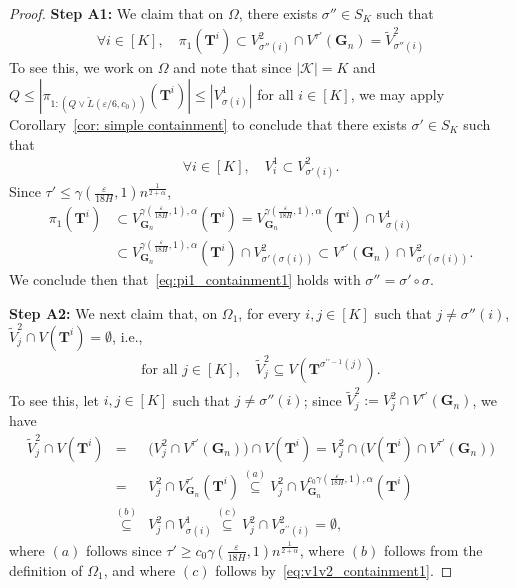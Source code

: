 \documentclass[twoside,11pt]{article}
\theoremstyle{remark}
\begin{document}
\begin{proof}
\textbf{Step A1:} We claim that on $\Omega$, there exists $\sigma'' \in S_K$ such that
\begin{align}
\forall i \in [K], \quad \pi_1(\bm{T}^{i}) \subset V_{\sigma''(i)}^2 \cap V^{\tau'}(\bm{G}_n) = \tilde{V}_{\sigma''(i)}^2\label{eq:pi1_containment1}
\end{align}
To see this, we work on $\Omega$ and note that since $|\mathcal{K}| = K$ and $Q \leq |\pi_{1:(Q \vee {\tilde{L}(\varepsilon/6, c_0)})}(\bm{T}^{i}) | \leq |V_{\sigma(i)}^1|$ for all $i \in [K]$, we may apply Corollary~\ref{cor: simple containment} to conclude that there exists $\sigma' \in S_K$ such that 
\begin{align}
\forall i \in [K], \quad V_i^1 \subset V_{\sigma'(i)}^2. \label{eq:v1v2_containment1}
\end{align}
Since $\tau' \leq \gamma(\frac{\varepsilon}{18H}, 1) n^{\frac{1}{2+\alpha}}$, 
\begin{align*}
\pi_1(\bm{T}^i) &\subset V_{\bm{G}_n}^{\gamma(\frac{\varepsilon}{18H}, 1), \alpha}(\bm{T}^i) = V_{\bm{G}_n}^{\gamma(\frac{\varepsilon}{18H}, 1), \alpha}(\bm{T}^i) \cap V_{\sigma(i)}^1 \\
%
&\subset V_{\bm{G}_n}^{\gamma(\frac{\varepsilon}{18H}, 1), \alpha}(\bm{T}^i) \cap V_{\sigma'(\sigma(i))}^2 \subset V^{\tau'}(\bm{G}_n) \cap V_{\sigma'(\sigma(i))}^2. 
\end{align*}
We conclude then that~\eqref{eq:pi1_containment1} holds with $\sigma'' = \sigma' \circ \sigma$.


\textbf{Step A2:} We next claim that, on $\Omega_1$, for every $i,j \in [K]$ such that $j \neq \sigma''(i)$, $\tilde{V}^2_{j} \cap V(\bm{T}^i) =\emptyset$, i.e., 
\begin{align}
\text{for all $j \in [K]$},\quad \tilde{V}^2_{j}\subseteq V(\bm{T}^{\sigma^{\prime\prime -1}(j)}). 
\label{eq: tilde vj2 well classified 2}
\end{align}
To see this, let $i, j \in [K]$ such that $j \neq \sigma''(i)$; since $\tilde{V}_{j}^2:=V_{j}^2 \cap V^{\tau'}(\bm{G}_n)$, we have 
%
\begin{eqnarray}
\label{eq: tilde vj2 well classified}
\nonumber
\tilde{V}_{j}^2 \cap V(\bm{T}^i)&=& \bigr({V}_{j}^2 \cap V^{\tau'}(\bm{G}_n)\bigr) \cap V(\bm{T}^i)={V}_{j}^2  \cap \bigr( V(\bm{T}^i)\cap V^{\tau'}(\bm{G}_n)\bigr)\\
\nonumber
&=& {V}_{j}^2 \cap V_{\bm G_n}^{\tau'}(\bm{T}^i) \stackrel{(a)}{\subseteq} {V}_{j}^2 \cap V_{\bm{G}_n}^{c_0 \gamma(\frac{\varepsilon}{18H},1),\alpha}(\bm{T}^i)\\
&\stackrel{(b)}{\subseteq} &{V}_{j}^2 \cap V^1_{\sigma(i)} \stackrel{(c)}{\subseteq} {V}_{j}^2 \cap V^2_{\sigma^{\prime\prime}(i)}=\emptyset,
\end{eqnarray}
where $(a)$ follows since $\tau' \geq c_0 \gamma(\frac{\varepsilon}{18H}, 1)n^{\frac{1}{2+\alpha}}$, where $(b)$ follows from the definition of $\Omega_1$, and where $(c)$ follows by~\eqref{eq:v1v2_containment1}.




\end{proof}
\end{document}

